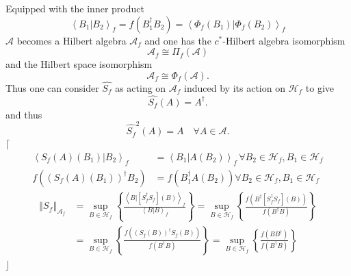 \documentclass[aps,preprint]{revtex4}%
\begin{document}
Equipped with the inner product
\begin{equation}
\left\langle \left.  B_{1}\right\vert B_{2}\right\rangle _{f}=f\left(
B_{1}^{\dagger}B_{2}\right)  =\left\langle \left.  \Phi_{f}\left(
B_{1}\right)  \right\vert \Phi_{f}\left(  B_{2}\right)  \right\rangle _{f}%
\end{equation}
$\mathcal{A}$ becomes a Hilbert algebra $\mathcal{A}_{f}$ and one has the
$c^{\ast}$-Hilbert algebra isomorphism
\begin{equation}
\mathcal{A}_{f}\cong\Pi_{f}\left(  \mathcal{A}\right)
\end{equation}
and the Hilbert space isomorphism
\begin{equation}
\mathcal{A}_{f}\cong\Phi_{f}\left(  \mathcal{A}\right)  .
\end{equation}
Thus one can consider $\widehat{S_{f}}$ as acting on $\mathcal{A}_{f}$ induced
by its action on $\mathcal{H}_{f}$ to give
\begin{equation}
\widehat{S_{f}}\left(  A\right)  =A^{\dagger}.
\end{equation}
and thus
\begin{equation}
\widehat{S_{f}}^{2}\left(  A\right)  =A\quad\forall A\in\mathcal{A}.
\end{equation}
$\lceil$%
\begin{align}
\left\langle \left.  S_{f}\left(  A\right)  \left(  B_{1}\right)  \right\vert
B_{2}\right\rangle _{f} &  =\left\langle \left.  B_{1}\right\vert A\left(
B_{2}\right)  \right\rangle _{f}\,\forall B_{2}\in\mathcal{H}_{f},B_{1}%
\in\mathcal{H}_{f}\\
f\left(  \left(  S_{f}\left(  A\right)  \left(  B_{1}\right)  \right)
^{\dagger}B_{2}\right)   &  =f\left(  B_{1}^{\dagger}A\left(  B_{2}\right)
\right)  \forall B_{2}\in\mathcal{H}_{f},B_{1}\in\mathcal{H}_{f}%
\end{align}%
\begin{align}
\left\Vert S_{f}\right\Vert _{\mathcal{A}_{f}}  & =\sup\limits_{B\in
\mathcal{H}_{f}}\left\{  \frac{\left\langle \left.  B\right\vert \left[
S_{f}^{\dagger}S_{f}\right]  \left(  B\right)  \right\rangle _{f}%
}{\left\langle \left.  B\right\vert B\right\rangle _{f}}\right\}
=\sup\limits_{B\in\mathcal{H}_{f}}\left\{  \frac{f\left(  B^{\dagger}\left[
S_{f}^{\dagger}S_{f}\right]  \left(  B\right)  \right)  }{f\left(  B^{\dagger
}B\right)  }\right\}  \\
& =\sup\limits_{B\in\mathcal{H}_{f}}\left\{  \frac{f\left(  \left(
S_{f}\left(  B\right)  \right)  ^{\dagger}S_{f}\left(  B\right)  \right)
}{f\left(  B^{\dagger}B\right)  }\right\}  =\sup\limits_{B\in\mathcal{H}_{f}%
}\left\{  \frac{f\left(  BB^{\dagger}\right)  }{f\left(  B^{\dagger}B\right)
}\right\}
\end{align}
$\rfloor$
\end{document}
